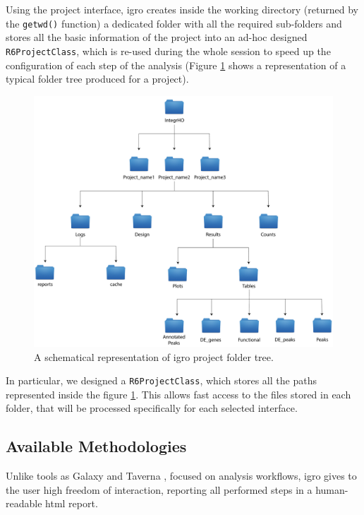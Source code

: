 Using the project interface, \gls{igro} creates inside the working directory (returned by the \lstinline!getwd()! function) a dedicated folder with all the required sub-folders and stores all the basic information of the project into an ad-hoc designed \lstinline!R6ProjectClass!, which is re-used during the whole session to speed up the configuration of each step of the analysis (Figure \ref{fig:integrhotree} shows a representation of a typical folder tree produced for a project).

\begin{figure}[ht]
\centering
\includegraphics[width=\textwidth, keepaspectratio]{img/integrho/project_folder.pdf}
\caption[IntegrHO folder tree]{A schematical representation of \gls{igro} project folder tree.}
\label{fig:integrhotree}
\end{figure}

In particular, we designed a \lstinline!R6ProjectClass!, which stores all the paths represented inside the figure \ref{fig:integrhotree}.
This allows fast access to the files stored in each folder, that will be processed specifically for each selected interface.


\subsection{Available Methodologies}

Unlike tools as Galaxy \cite{Hillman-Jackson2012} and Taverna \cite{Wolstencroft2013}, focused on analysis workflows, \gls{igro} gives to the user high freedom of interaction, reporting all performed steps in a human-readable \gls{html} report.
 
